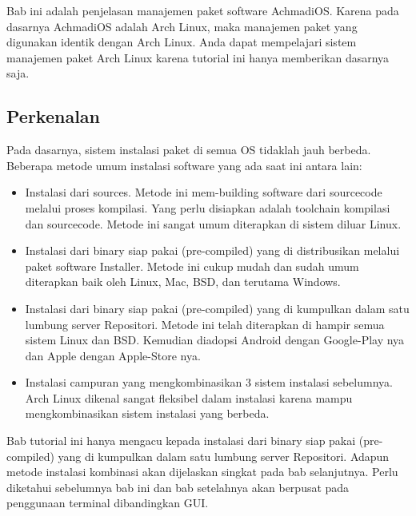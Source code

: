 \documentclass[12pt,]{article}
\begin{document}
	Bab ini adalah penjelasan manajemen paket software AchmadiOS.
	Karena pada dasarnya AchmadiOS adalah Arch Linux, maka manajemen paket yang digunakan identik dengan Arch Linux.
	Anda dapat mempelajari sistem manajemen paket Arch Linux karena tutorial ini hanya memberikan dasarnya saja.
	
	\subsection{Perkenalan}
	Pada dasarnya, sistem instalasi paket di semua OS tidaklah jauh berbeda. 
	Beberapa metode umum instalasi software yang ada saat ini antara lain:
	\begin{itemize}
		\item Instalasi dari sources. 
		Metode ini mem-building software dari sourcecode melalui proses kompilasi.
		Yang perlu disiapkan adalah toolchain kompilasi dan sourcecode.
		Metode ini sangat umum diterapkan di sistem diluar Linux.
		
		\item Instalasi dari binary siap pakai (pre-compiled) yang di distribusikan melalui paket software Installer.
		 Metode ini cukup mudah dan sudah umum diterapkan baik oleh Linux, Mac, BSD, dan terutama Windows.
		 
		\item Instalasi dari binary siap pakai (pre-compiled) yang di kumpulkan dalam satu lumbung server Repositori.
		Metode ini telah diterapkan di hampir semua sistem Linux dan BSD. 
		Kemudian diadopsi Android dengan Google-Play nya dan Apple dengan Apple-Store nya.
		
		\item Instalasi campuran yang mengkombinasikan 3 sistem instalasi sebelumnya.
		Arch Linux dikenal sangat fleksibel dalam instalasi karena mampu mengkombinasikan sistem instalasi yang berbeda.
	\end{itemize}

	Bab tutorial ini hanya mengacu kepada instalasi dari binary siap pakai (pre-compiled) yang di kumpulkan dalam satu lumbung server Repositori.
	Adapun metode instalasi kombinasi akan dijelaskan singkat pada bab selanjutnya.
	Perlu diketahui sebelumnya bab ini dan bab setelahnya akan berpusat pada penggunaan terminal dibandingkan GUI.
	
\end{document}
